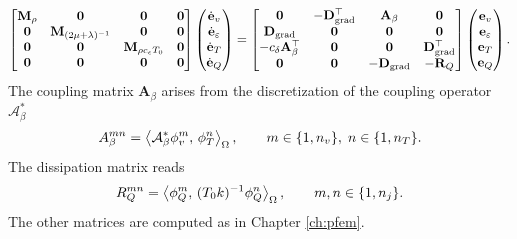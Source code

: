 \begin{equation}\label{eq:pHfindim_ThermoElas}
\begin{bmatrix}
\mathbf{M}_{\rho} & \mathbf{0} & \mathbf{0} & \mathbf{0}\\
\mathbf{0} & \mathbf{M}_{(2\mu + \lambda)^{-1}} & \mathbf{0} & \mathbf{0} \\
\mathbf{0} & \mathbf{0} & \mathbf{M}_{\rho c_\epsilon T_0} & \mathbf{0} \\
\mathbf{0} & \mathbf{0} & \mathbf{0} & \mathbf{0} \\
\end{bmatrix}
\begin{pmatrix}
\dot{\mathbf{e}}_v\\
\dot{\mathbf{e}}_\varepsilon\\
\dot{\mathbf{e}}_T\\
\dot{\mathbf{e}}_Q\\
\end{pmatrix}
= \begin{bmatrix}
\mathbf{0} & -\mathbf{D}_{\grad}^\top & \mathbf{A}_{\beta} & \mathbf{0}\\
\mathbf{D}_{\grad} & \mathbf{0} & \mathbf{0} & \mathbf{0} \\
-c_\delta \mathbf{A}_{\beta}^\top & \mathbf{0} &  \mathbf{0} & \mathbf{D}_{\grad}^\top \\
\mathbf{0} & \mathbf{0} & -\mathbf{D}_{\grad} & -\mathbf{R}_Q \\
\end{bmatrix}
\begin{pmatrix}
{\mathbf{e}}_v\\
{\mathbf{e}}_\varepsilon\\
{\mathbf{e}}_T\\
{\mathbf{e}}_Q\\
\end{pmatrix}.
\end{equation}
The coupling matrix $\mathbf{A}_{\beta}$ arises from the discretization of the coupling operator $\mathcal{A}_\beta^*$
\begin{equation*}
{A}_{\beta}^{mn} =\inner[\Omega]{\mathcal{A}_\beta^* \phi_v^m}{\phi_T^n}, \qquad m \in \{1, n_v\}, \; n \in \{1, n_T\}.
\end{equation*}
The dissipation matrix reads
\begin{equation*}
{R}_Q^{mn} = \inner[\Omega]{\phi_Q^m}{(T_0 k)^{-1} \phi_Q^n}, \qquad m,n \in \{1, n_j\}.
\end{equation*}
The other matrices are computed as in Chapter \ref{ch:pfem}.


